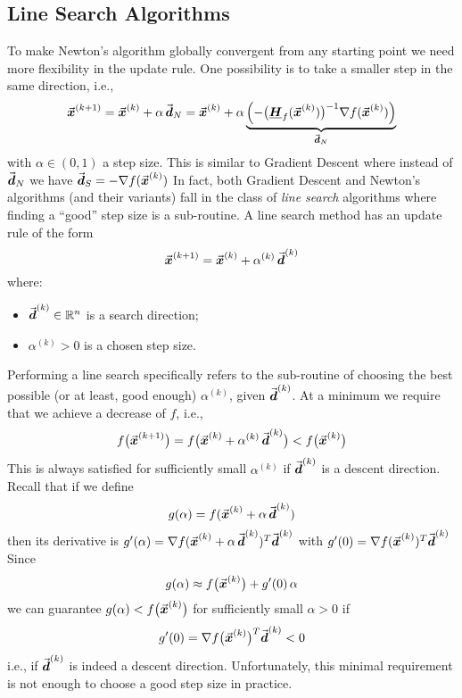 
\subsection{Line Search Algorithms}

To make Newton's algorithm globally convergent from any starting point we need more flexibility in the update rule. One possibility is to take a smaller step in the same direction, i.e.,
\[
\vec{\boldsymbol{x}}^{(k+1)} = \vec{\boldsymbol{x}}^{(k)} + \alpha\, \vec{\boldsymbol{d}}_{N} = \vec{\boldsymbol{x}}^{(k)} + \alpha 
\underbrace{
\left(-\big(\underline{\boldsymbol{H}}_{f}(\vec{\boldsymbol{x}}^{(k)})\big)^{-1}\nabla f(\vec{\boldsymbol{x}}^{(k)})\right) 
}_{\vec{\boldsymbol{d}}_{N}}
\]
with \(\alpha \in (0,1)\) a step size. This is similar to Gradient Descent where instead of 
\(
\vect{d}_{N} %
\)
we have
\(
\vect{d}_{S} = -\nabla f(\vect{x}^{(k)}) %
\)
In fact, both Gradient Descent and Newton's algorithms (and their variants) fall in the class of \emph{line search} algorithms where finding a “good” step size is a sub-routine. A line search method has an update rule of the form
\[
\vect{x}^{(k+1)} = \vect{x}^{(k)} + \alpha^{(k)}\, \vect{d}^{(k)} %
\]
where:
\begin{itemize}
  \item \(\vec{\boldsymbol{d}}^{(k)} \in \mathbb{R}^n\) is a search direction;
  \item \(\alpha^{(k)} > 0\) is a chosen step size.
\end{itemize}

Performing a line search specifically refers to the sub-routine of choosing the best possible (or at least, good enough) \(\alpha^{(k)}\), given \(\vec{\boldsymbol{d}}^{(k)}\). 
At a minimum we require that we achieve a decrease of \(f\), i.e.,
\[
f\bigl(\vect{x}^{(k+1)}\bigr) = f\bigl(\vect{x}^{(k)} + \alpha^{(k)}\,\vect{d}^{(k)}\bigr) < f\bigl(\vect{x}^{(k)}\bigr) %
\]
This is always satisfied for sufficiently small \(\alpha^{(k)}\) if \(\vec{\boldsymbol{d}}^{(k)}\) is a descent direction. 
Recall that if we define
\[
g(\alpha) = f(\vect{x}^{(k)} + \alpha\, \vect{d}^{(k)}) %
\]
then its derivative is
\(
g'(\alpha) = \nabla f(\vect{x}^{(k)} + \alpha\, \vect{d}^{(k)})^T \vect{d}^{(k)} %
\)
with
\(
g'(0) = \nabla f(\vect{x}^{(k)})^T \vect{d}^{(k)} %
\)
Since
\[
g(\alpha) \approx f\bigl(\vect{x}^{(k)}\bigr) + g'(0)\,\alpha %
\]
we can guarantee \(g(\alpha) < f\bigl(\vec{\boldsymbol{x}}^{(k)}\bigr)\) for sufficiently small \(\alpha>0\) if
\[
g'(0) = \nabla f\bigl(\vect{x}^{(k)}\bigr)^T \vect{d}^{(k)} < 0 %
\]
i.e., if \(\vec{\boldsymbol{d}}^{(k)}\) is indeed a descent direction. Unfortunately, this minimal requirement is not enough to choose a good step size in practice.

